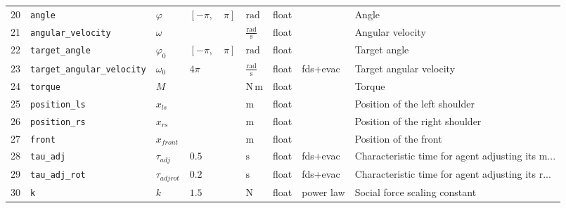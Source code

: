 \begin{tabularx}{1.0\linewidth}{llllllll}
20 &                    \verb|angle| &        $\varphi$ &  $\left [ - \pi, \quad \pi\right ]$ &               $\mathrm{rad}$ &       float &            &                                              Angle \\
21 &         \verb|angular_velocity| &         $\omega$ &                                     &     $\mathrm{\frac{rad}{s}}$ &       float &            &                                   Angular velocity \\
22 &             \verb|target_angle| &    $\varphi_{0}$ &  $\left [ - \pi, \quad \pi\right ]$ &               $\mathrm{rad}$ &       float &            &                                       Target angle \\
23 &  \verb|target_angular_velocity| &     $\omega_{0}$ &                             $4 \pi$ &     $\mathrm{\frac{rad}{s}}$ &       float &   fds+evac &                            Target angular velocity \\
24 &                   \verb|torque| &              $M$ &                                     &              $\mathrm{N\,m}$ &       float &            &                                             Torque \\
25 &              \verb|position_ls| &         $x_{ls}$ &                                     &                 $\mathrm{m}$ &       float &            &                      Position of the left shoulder \\
26 &              \verb|position_rs| &         $x_{rs}$ &                                     &                 $\mathrm{m}$ &       float &            &                     Position of the right shoulder \\
27 &                    \verb|front| &      $x_{front}$ &                                     &                 $\mathrm{m}$ &       float &            &                              Position of the front \\
28 &                  \verb|tau_adj| &     $\tau_{adj}$ &                               $0.5$ &                 $\mathrm{s}$ &       float &   fds+evac &  Characteristic time for agent adjusting its  m... \\
29 &              \verb|tau_adj_rot| &  $\tau_{adjrot}$ &                               $0.2$ &                 $\mathrm{s}$ &       float &   fds+evac &  Characteristic time for agent adjusting its  r... \\
30 &                        \verb|k| &              $k$ &                               $1.5$ &                 $\mathrm{N}$ &       float &  power law &                      Social force scaling constant \\

\end{tabularx}
